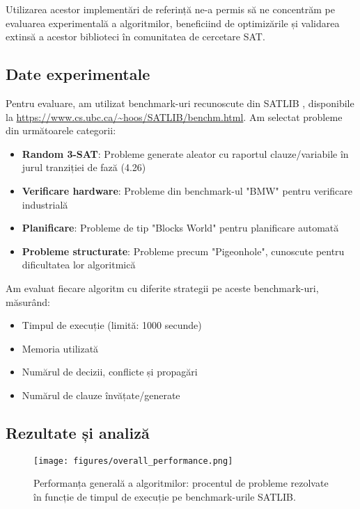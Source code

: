 \documentclass[a4paper,10pt]{article}
\begin{document}
Utilizarea acestor implementări de referință ne-a permis să ne concentrăm pe evaluarea experimentală a algoritmilor, beneficiind de optimizările și validarea extinsă a acestor biblioteci în comunitatea de cercetare SAT.

\subsection{Date experimentale}

Pentru evaluare, am utilizat benchmark-uri recunoscute din SATLIB \cite{Hoos2000}, disponibile la \url{https://www.cs.ubc.ca/~hoos/SATLIB/benchm.html}. Am selectat probleme din următoarele categorii:

\begin{itemize}
    \item \textbf{Random 3-SAT}: Probleme generate aleator cu raportul clauze/variabile în jurul tranziției de fază (4.26)
    \item \textbf{Verificare hardware}: Probleme din benchmark-ul "BMW" pentru verificare industrială
    \item \textbf{Planificare}: Probleme de tip "Blocks World" pentru planificare automată
    \item \textbf{Probleme structurate}: Probleme precum "Pigeonhole", cunoscute pentru dificultatea lor algoritmică
\end{itemize}

Am evaluat fiecare algoritm cu diferite strategii pe aceste benchmark-uri, măsurând:
\begin{itemize}
    \item Timpul de execuție (limită: 1000 secunde)
    \item Memoria utilizată
    \item Numărul de decizii, conflicte și propagări
    \item Numărul de clauze învățate/generate
\end{itemize}

\subsection{Rezultate și analiză}
\begin{figure}[h]
    \centering
    \texttt{[image: figures/overall\_performance.png]}
    \caption{Performanța generală a algoritmilor: procentul de probleme rezolvate în funcție de timpul de execuție pe benchmark-urile SATLIB.}
    \label{fig:overall_performance}
\end{figure}
\end{document}
